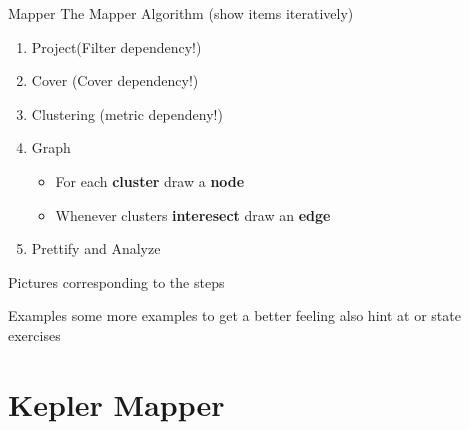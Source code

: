 \documentclass{beamer}
\begin{document}
\begin{frame}{Mapper}
The Mapper Algorithm (show items iteratively)
\begin{enumerate}
	\item Project(Filter dependency!)
	\item Cover (Cover dependency!)
	\item Clustering (metric dependeny!)
	\item Graph 
	\begin{itemize}
		\item For each \textbf{cluster} draw a \textbf{node}
		\item Whenever clusters \textbf{interesect} draw an \textbf{edge}
	\end{itemize}
	\item Prettify and Analyze
\end{enumerate}
Pictures corresponding to the steps
\end{frame}


\begin{frame}{Examples}
some more examples to get a better feeling
also hint at or state exercises
\end{frame}


\section{Kepler Mapper}
\end{document}
